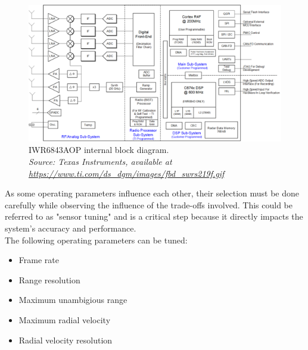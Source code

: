 \begin{figure}[!htbp]
    \centering
    \includegraphics[width=1.0\linewidth]{images/blockdiagram.png}
    \caption{IWR6843AOP internal block diagram.\\
    \textit{Source: Texas Instruments, available at \url{https://www.ti.com/ds_dgm/images/fbd_swrs219f.gif}}}
    \label{fig:IWR6843AOP_internal}
\end{figure}

As some operating parameters influence each other, their selection must be done carefully while observing the influence of the trade-offs involved.
This could be referred to as "sensor tuning" and is a critical step because it directly impacts the system's accuracy and performance.
\\
\newline
\newline
\newline
\newline
The following operating parameters can be tuned:
\begin{itemize}
    \item Frame rate
    \item Range resolution
    \item Maximum unambigious range
    \item Maximum radial velocity
    \item Radial velocity resolution
\end{itemize}

